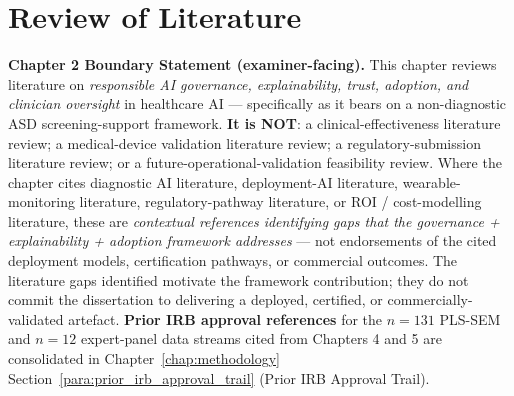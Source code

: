 
\chapter{Review of Literature}

\noindent\textbf{Chapter 2 Boundary Statement (examiner-facing).}
\label{para:ch2_boundary_statement}
This chapter reviews literature on \emph{responsible AI governance, explainability, trust, adoption, and clinician oversight} in healthcare AI --- specifically as it bears on a non-diagnostic ASD screening-support framework. \textbf{It is NOT}: a clinical-effectiveness literature review; a medical-device validation literature review; a regulatory-submission literature review; or a future-operational-validation feasibility review. Where the chapter cites diagnostic AI literature, deployment-AI literature, wearable-monitoring literature, regulatory-pathway literature, or ROI / cost-modelling literature, these are \emph{contextual references identifying gaps that the governance + explainability + adoption framework addresses} --- not endorsements of the cited deployment models, certification pathways, or commercial outcomes. The literature gaps identified motivate the framework contribution; they do not commit the dissertation to delivering a deployed, certified, or commercially-validated artefact. \textbf{Prior IRB approval references} for the $n{=}131$ PLS-SEM and $n{=}12$ expert-panel data streams cited from Chapters 4 and 5 are consolidated in Chapter~\ref{chap:methodology} Section~\ref{para:prior_irb_approval_trail} (Prior IRB Approval Trail).

